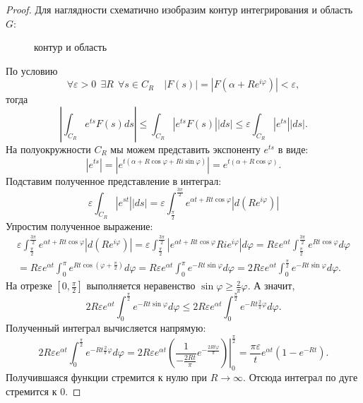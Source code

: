 \documentclass[../paper.tex]{subfile}
\begin{document}
\begin{proof}
Для наглядности схематично изобразим контур интегрирования и область $G$:

\begin{figure}[!ht]
	\centering
	
	\caption{контур и область}
\end{figure}

По условию
\[
	\forall \varepsilon > 0 \ \  \exists R \ \ \forall s \in C_R \quad \left| F(s) \right| = \left| F\left(\alpha + Re^{i\varphi}\right) \right|  < \varepsilon
,\] тогда
\[
	\left|\int_{C_R} e^{ts} F(s) ds\right|
	\le \int_{C_R} \left|e^{ts} F(s)\right| |ds|
	\le \varepsilon \int_{C_R} \left|e^{ts}\right| |ds|
.\]
На полуокружности $C_R$ мы можем представить экспоненту $e^{ts}$ в виде:
\[
	\left|e^{ts}\right|
	= \left|e^{t\left(\alpha+R\cos\varphi+Ri\sin\varphi\right)}\right|
	= e^{t\left(\alpha + R\cos\varphi\right)}
.\]
Подставим полученное представление в интеграл:
\[
	\varepsilon \int_{C_R} \left|e^{st}\right| |ds|
	= \varepsilon \int_{\frac{\pi}{2}}^{\frac{3\pi}{2}} e^{\alpha t + R t \cos \varphi} \left|d\left(Re^{i\varphi}\right)\right|
\]
Упростим полученное выражение:
\begin{multline*}
	\varepsilon \int_{\frac{\pi}{2}}^{\frac{3\pi}{2}} e^{\alpha t + R t \cos \varphi} \left|d\left(Re^{i\varphi}\right)\right|
	= \varepsilon \int_{\frac{\pi}{2}}^{\frac{3\pi}{2}} \left|e^{\alpha t + R t \cos \varphi} R i e^{i\varphi} \right| d\varphi
	= R\varepsilon e^{\alpha t} \int_{\frac{\pi}{2}}^{\frac{3\pi}{2}} e^{R t \cos\varphi} d\varphi
	\\= R\varepsilon e^{\alpha t} \int_{0}^{\pi} e^{R t \cos \left(\varphi + \frac{\pi}{2}\right)} d\varphi
	= R\varepsilon e^{\alpha t} \int_{0}^{\pi} e^{-R t \sin\varphi} d\varphi
	= 2R\varepsilon e^{\alpha t} \int_{0}^{\frac{\pi}{2}} e^{-R t \sin\varphi} d\varphi
.\end{multline*}
На отрезке $[0, \frac{\pi}{2}]$ выполняется неравенство $\sin\varphi \ge \frac{2}{\pi} \varphi$.
А значит,
\[
	2R\varepsilon e^{\alpha t} \int_{0}^{\frac{\pi}{2}} e^{-R t \sin\varphi} d\varphi
	\le 2R\varepsilon e^{\alpha t} \int_{0}^{\frac{\pi}{2}} e^{-R t \frac{2}{\pi}\varphi} d\varphi
.\]
Полученный интеграл вычисляется напрямую:
\[
	2R\varepsilon e^{\alpha t} \int_{0}^{\frac{\pi}{2}} e^{-R t \frac{2}{\pi}\varphi} d\varphi
	= 2R\varepsilon e^{\alpha t} \left.\left( \frac{1}{-\frac{2Rt}{\pi}}e^{- \frac{2 R t \varphi}{\pi}} \right) \right|_0^{\frac{\pi}{2}} 
        = \frac{\pi\varepsilon}{t} e^{\alpha t} \left(1 - e^{- R t} \right)
.\]
Получившаяся функции стремится к нулю при $R \to \infty$.
Отсюда интеграл по дуге стремится к $0$.
\end{proof}
\end{document}
